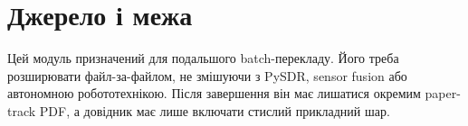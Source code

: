 \section{Джерело і межа}


Цей модуль призначений для подальшого batch-перекладу. Його треба розширювати файл-за-файлом, не змішуючи з PySDR, sensor fusion або автономною робототехнікою. Після завершення він має лишатися окремим paper-track PDF, а довідник має лише включати стислий прикладний шар.
